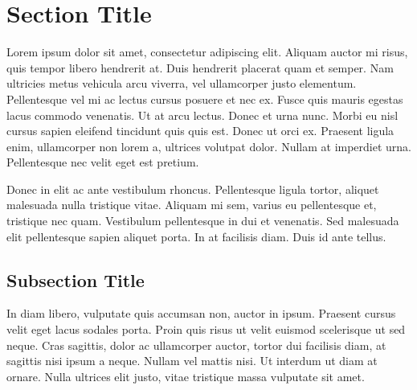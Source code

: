 \documentclass[
	a4paper, %
	12pt, %
]{CSSullivanBusinessReport}
\begin{document}
\newpage


\section{Section Title} %

Lorem ipsum dolor sit amet, consectetur adipiscing elit. Aliquam auctor mi risus, quis tempor libero hendrerit at. Duis hendrerit placerat quam et semper. Nam ultricies metus vehicula arcu viverra, vel ullamcorper justo elementum. Pellentesque vel mi ac lectus cursus posuere et nec ex. Fusce quis mauris egestas lacus commodo venenatis. Ut at arcu lectus. Donec et urna nunc. Morbi eu nisl cursus sapien eleifend tincidunt quis quis est. Donec ut orci ex. Praesent ligula enim, ullamcorper non lorem a, ultrices volutpat dolor. Nullam at imperdiet urna. Pellentesque nec velit eget est pretium.

Donec in elit ac ante vestibulum rhoncus. Pellentesque ligula tortor, aliquet malesuada nulla tristique vitae. Aliquam mi sem, varius eu pellentesque et, tristique nec quam. Vestibulum pellentesque in dui et venenatis. Sed malesuada elit pellentesque sapien aliquet porta. In at facilisis diam. Duis id ante tellus. %

\subsection{Subsection Title} %

In diam libero, vulputate quis accumsan non, auctor in ipsum. Praesent cursus velit eget lacus sodales porta. Proin quis risus ut velit euismod scelerisque ut sed neque. Cras sagittis, dolor ac ullamcorper auctor, tortor dui facilisis diam, at sagittis nisi ipsum a neque. Nullam vel mattis nisi. Ut interdum ut diam at ornare. Nulla ultrices elit justo, vitae tristique massa vulputate sit amet.
\end{document}
